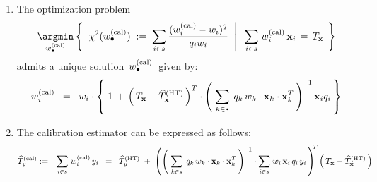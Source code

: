\begin{lemma}
\mbox{}
\vskip 0.01cm
\noindent
\begin{enumerate}
\item
    The optimization problem
    \begin{equation*}
    \underset{w^{\textnormal{(cal)}}_{\bullet}}{\argmin}
    \left\{\;\,
        \left.
        \chi^{2}(w^{\textnormal{(cal)}}_{\bullet})
        \;:=\;
            \underset{i \in s}{\sum}\,
            \dfrac{(w^{\textnormal{(cal)}}_{i}-w_{i})^{2}}{q_{i}w_{i}}
        \;\;\right\vert\;\;
            \underset{i \in s}{\sum}\;
            w^{\textnormal{(cal)}}_{i}\,\mathbf{x}_{i}
            \,=\,
            T_{\mathbf{x}}
        \;\,\right\}
    \end{equation*}
    admits a unique solution
    \,$w^{\textnormal{(cal)}}_{\bullet}$\,
    given by:
    \begin{equation*}
    w^{\textnormal{(cal)}}_{i}
    \;\; = \;\;
        w_{i}\cdot\left\{\;
            1
            \,+\,
            \left(\,T_{\mathbf{x}} - \widehat{T}_{\mathbf{x}}^{\textnormal{(HT)}}\,\right)^{T}
            \cdot
            \left(\;
                \underset{k \in s}{\sum}\;\,q_{k}\,w_{k}\cdot\mathbf{x}_{k}\cdot\mathbf{x}_{k}^{T}
                \,\right)^{\!-1}
            \mathbf{x}_{i}q_{i}
            \,\right\}
    \end{equation*}
\item
    The calibration estimator can be expressed as follows:
    \begin{eqnarray*}
    \widehat{T}_{y}^{\textnormal{(cal)}}
    & := &
        \underset{i \in s}{\sum}\;
        w^{\textnormal{(cal)}}_{i}\,y_{i}
    \;\; = \;\;
        \widehat{T}^{\textnormal{(HT)}}_{y}
        \; + \;
        \left(
            \left(\;
                \underset{k \in s}{\sum}\;\,q_{k}\,w_{k}\cdot\mathbf{x}_{k}\cdot\mathbf{x}_{k}^{T}
                \,\right)^{\!-1}
            \cdot
            \underset{i \in s}{\sum}\;
            w_{i}\,\mathbf{x}_{i}\,q_{i}\,y_{i}
            \,\right)^{\!\!T}
        \left(\,T_{\mathbf{x}} - \widehat{T}_{\mathbf{x}}^{\textnormal{(HT)}}\,\right)
    \end{eqnarray*}
\end{enumerate}
\end{lemma}
\proof
